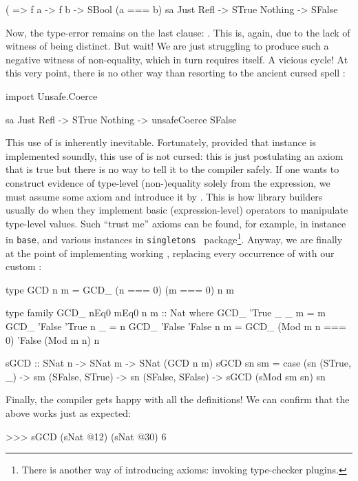 \documentclass[demotion-paper.tex]{subfiles}
\begin{document}
\begin{code}
(%
       => f a -> f b -> SBool (a === b)
sa %
  Just Refl -> STrue
  Nothing -> SFalse  
\end{code}

Now, the type-error remains on the last clause: .
This is, again, due to the lack of witness of being distinct.
But wait! We are just struggling to produce such a negative witness of non-equality, which in turn requires itself. A vicious cycle!
At this very point, there is no other way than resorting to the ancient cursed spell :
\begin{code}
import Unsafe.Coerce

sa %
  Just Refl -> STrue
  Nothing -> unsafeCoerce SFalse  
\end{code}
This use of  is inherently inevitable.
Fortunately, provided that  instance is implemented soundly, this use of  is not cursed: this is just postulating an axiom that is true but there is no way to tell it to the compiler safely.
If one wants to construct evidence of type-level (non-)equality solely from the expression, we must assume some axiom and introduce it by .
This is how library builders usually do when they implement basic (expression-level) operators to manipulate type-level values.
Such ``trust me'' axioms can be found, for example, in  instance in \texttt{base}, and various  instances in \texttt{singletons}~\cite{singletons} package\footnote{There is another way of introducing axioms: invoking type-checker plugins.}.
Anyway, we are finally at the point of implementing working , replacing every occurrence of \hask{(==)} with our custom \hask{(===)}:

\begin{code}
type GCD n m = GCD_ (n === 0) (m === 0) n m

type family GCD_ nEq0 mEq0 n m :: Nat where
  GCD_ 'True  _      _ m = m
  GCD_ 'False 'True  n _ = n
  GCD_ 'False 'False n m = 
    GCD_ (Mod m n === 0) 'False (Mod m n) n

sGCD :: SNat n -> SNat m -> SNat (GCD n m)
sGCD sn sm =
  case (sn %
    (STrue, _) -> sm
    (SFalse, STrue) -> sn
    (SFalse, SFalse) -> sGCD (sMod sm sn) sn
\end{code}

Finally, the compiler gets happy with all the definitions!
We can confirm that the above  works just as expected:
\begin{repl}
>>> sGCD (sNat @12) (sNat @30)
6
\end{repl}
\end{document}
